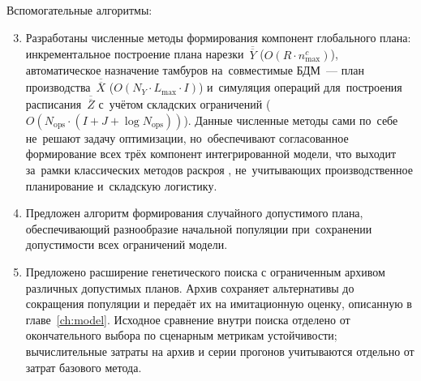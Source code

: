 \noindent Вспомогательные алгоритмы:
\begin{enumerate}
    \setcounter{enumi}{2}
    \item Разработаны численные методы формирования компонент глобального плана: инкрементальное построение плана нарезки~$\overline{\overline{Y}}$ ($O(R\cdot n^c_{\max})$), автоматическое назначение тамбуров на~совместимые БДМ~--- план производства~$\overline{\overline{X}}$ ($O(N_Y\cdot L_{\max}\cdot I)$) и~симуляция операций для~построения расписания~$\overline{\overline{Z}}$ с~учётом складских ограничений ($O(N_{\mathrm{ops}}\cdot(I+J+\log N_{\mathrm{ops}}))$).
    Данные численные методы сами по~себе не~решают задачу оптимизации, но~обеспечивают согласованное формирование всех трёх компонент интегрированной модели, что выходит за~рамки классических методов раскроя \cite{gilmore1961linear,haessler1991}, не~учитывающих производственное планирование и~складскую логистику.
    \item Предложен алгоритм формирования случайного допустимого плана, обеспечивающий разнообразие начальной популяции при~сохранении допустимости всех ограничений модели.
    \item Предложено расширение генетического поиска с ограниченным архивом различных допустимых планов. Архив сохраняет альтернативы до сокращения популяции и передаёт их на имитационную оценку, описанную в главе~\ref{ch:model}. Исходное сравнение внутри поиска отделено от окончательного выбора по сценарным метрикам устойчивости; вычислительные затраты на архив и серии прогонов учитываются отдельно от затрат базового метода.
\end{enumerate}
